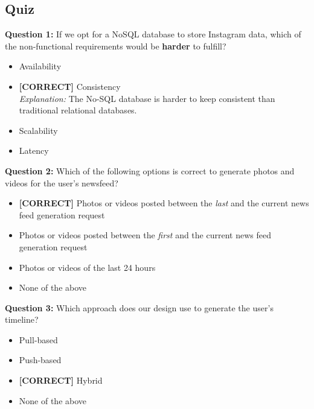 

\subsection*{Quiz}
\vspace{0.3cm}
\noindent
\textbf{Question 1:} If we opt for a NoSQL database to store Instagram data, which of the non-functional requirements would be \textbf{harder} to fulfill?
\\[0.2cm]
\begin{itemize}
 \item Availability
 \item \textbf{[CORRECT]} Consistency
\\[0.1cm]
\textit{Explanation:} 
The No-SQL database is harder to keep consistent than traditional relational databases.
 \item Scalability
 \item Latency
\end{itemize}
\vspace{0.3cm}
\noindent
\textbf{Question 2:} Which of the following options is correct to generate photos and videos for the user's newsfeed?
\\[0.2cm]
\begin{itemize}
 \item \textbf{[CORRECT]} Photos or videos posted between the \emph{last} and the current news feed generation request
 \item Photos or videos posted between the \emph{first} and the current news feed generation request
 \item Photos or videos of the last 24 hours
 \item None of the above
\end{itemize}
\vspace{0.3cm}
\noindent
\textbf{Question 3:} Which approach does our design use to generate the user's timeline?
\\[0.2cm]
\begin{itemize}
 \item Pull-based
 \item Push-based
 \item \textbf{[CORRECT]} Hybrid
 \item None of the above
\end{itemize}



